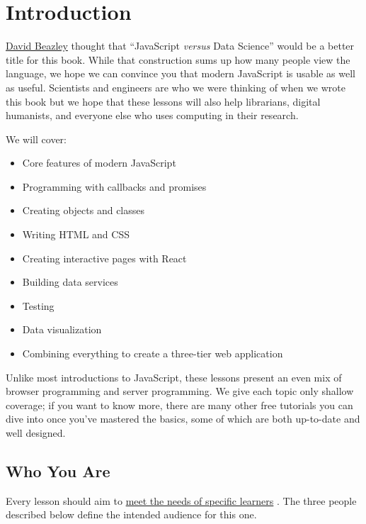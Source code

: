 \chapter{Introduction}\label{s:intro}

\href{https://www.dabeaz.com/}{David Beazley} thought that ``JavaScript \emph{versus} Data Science''
would be a better title for this book.
While that construction sums up how many people view the language,
we hope we can convince you that modern JavaScript is usable as well as useful.
Scientists and engineers are who we were thinking of when we wrote this book
but we hope that these lessons will also help librarians,
digital humanists,
and everyone else who uses computing in their research.

We will cover:

\begin{itemize}
\item
  Core features of modern JavaScript
\item
  Programming with callbacks and promises
\item
  Creating objects and classes
\item
  Writing HTML and CSS
\item
  Creating interactive pages with React
\item
  Building data services
\item
  Testing
\item
  Data visualization
\item
  Combining everything to create a three-tier web application
\end{itemize}

Unlike most introductions to JavaScript,
these lessons present an even mix of browser programming and server programming.
We give each topic only shallow coverage;
if you want to know more,
there are many other free tutorials you can dive into once you've mastered the basics,
some of which are both up-to-date and well designed.

\section{Who You Are}\label{s:intro-personas}

Every lesson should aim to \href{http://teachtogether.tech/en/process/}{meet the needs of specific learners} \cite{Wils2018}.
The three people described below define the intended audience for this one.

